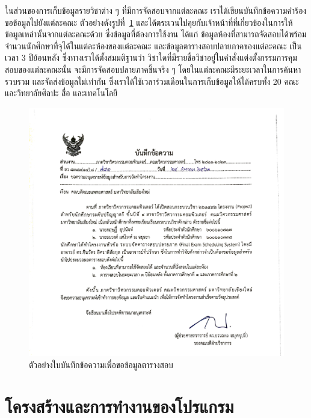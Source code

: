ในส่วนของการเก็บข้อมูลรายวิชาต่าง ๆ ที่มีการจัดสอบจากแต่ละคณะ เราได้เขียนบันทึกข้อความคำร้องขอข้อมูลไปยังแต่ละคณะ ตัวอย่างดังรูปที่~\ref{fig:request-memo-scan} 
และได้ตระเวนไปคุยกับเจ้าหน้าที่ที่เกี่ยวข้องในการให้ข้อมูลเหล่านั้นจากแต่ละคณะด้วย
ซึ่งข้อมูลที่ต้องการใช้งาน ได้แก่ ข้อมูลห้องที่สามารถจัดสอบได้พร้อมจำนวนนักศึกษาที่จุได้ในแต่ละห้องของแต่ละคณะ และข้อมูลตารางสอบปลายภาคของแต่ละคณะ เป็นเวลา 3 ปีย้อนหลัง
ซึ่งทางเราได้ตั้งสมมติฐานว่า วิชาใดที่มีรายชื่อวิชาอยู่ในคำสั่งแต่งตั้งกรรมการคุมสอบของแต่ละคณะนั้น จะมีการจัดสอบปลายภาคขึ้นจริง ๆ โดยในแต่ละคณะมีระยะเวลาในการค้นหา รวบรวม และจัดส่งข้อมูลไม่เท่ากัน
ซึ่งเราได้ใช้เวลาร่วมเดือนในการเก็บข้อมูลให้ได้ครบทั้ง 20 คณะ และวิทยาลัยศิลปะ สื่อ และเทคโนโลยี
\begin{figure}
  \begin{center}
    \includegraphics[width=\linewidth]{images/request_memo_scan_crop.png}
  \end{center}
  \caption[ตัวอย่างใบบันทึกข้อความเพื่อขอข้อมูลตารางสอบ]{ตัวอย่างใบบันทึกข้อความเพื่อขอข้อมูลตารางสอบ}
  \label{fig:request-memo-scan}     
\end{figure}

\section{โครงสร้างและการทำงานของโปรแกรม}

